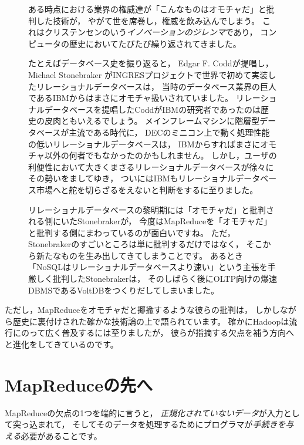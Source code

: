 \begin{figure}[t]
\begin{screen}
 \vspace*{3mm}

 ある時点における業界の権威達が「こんなものはオモチャだ」と批判した技術が，
 やがて世を席巻し，権威を飲み込んでしまう。
 これはクリステンセンのいう{\em イノベーションのジレンマ}であり，
 コンピュータの歴史においてたびたび繰り返されてきました。

 たとえばデータベース史を振り返ると，
 Edgar F. Coddが提唱し，
 Michael Stonebraker がINGRESプロジェクトで世界で初めて実装したリレーショナルデータベースは，
 当時のデータベース業界の巨人であるIBMからはまさにオモチャ扱いされていました。
 リレーショナルデータベースを提唱したCoddがIBMの研究者であったのは歴史の皮肉ともいえるでしょう。
 メインフレームマシンに階層型データベースが主流である時代に，
 DECのミニコン上で動く処理性能の低いリレーショナルデータベースは，
 IBMからすればまさにオモチャ以外の何者でもなかったのかもしれません。
 しかし，ユーザの利便性において大きくまさるリレーショナルデータベースが徐々にその勢いをましてゆき，
 ついにはIBMもリレーショナルデータベース市場へと舵を切らざるをえないと判断をするに至りました。

 リレーショナルデータベースの黎明期には「オモチャだ」と批判される側にいたStonebrakerが，
 今度はMapReduceを「オモチャだ」と批判する側にまわっているのが面白いですね。
 ただ，Stonebrakerのすごいところは単に批判するだけではなく，
 そこから新たなものを生み出してきてしまうことです。
 あるとき「NoSQLはリレーショナルデータベースより速い」という主張を手厳しく批判したStonebrakerは，
 そのしばらく後にOLTP向けの爆速DBMSであるVoltDBをつくりだしてしまいました。
\end{screen}
\end{figure}

ただし，MapReduceをオモチャだと揶揄するような彼らの批判は，
しかしながら歴史に裏付けされた確かな技術論の上で語られています。
確かにHadoopは流行にのって広く普及するには至りましたが，
彼らが指摘する欠点を補う方向へと進化をしてきているのです。

\section{MapReduceの先へ}

MapReduceの欠点の1つを端的に言うと，
{\em 正規化されていないデータ}が入力として突っ込まれて，
そしてそのデータを処理するためにプログラマが{\em 手続きを与える}必要があることです。

